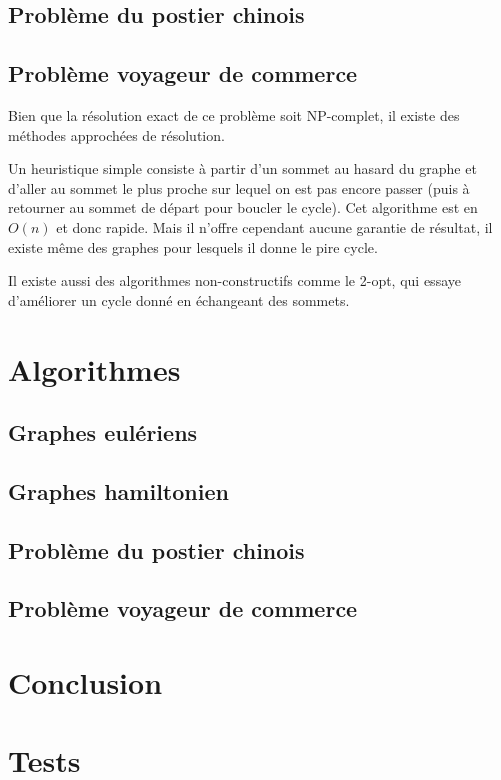 \documentclass{scrartcl}
\begin{document}
  \subsection{Problème du postier chinois}
  \subsection{Problème voyageur de commerce}
    Bien que la résolution exact de ce problème soit NP-complet, il existe des
    méthodes approchées de résolution.

    Un heuristique simple consiste à partir d'un sommet au hasard du graphe et
    d'aller au sommet le plus proche sur lequel on est pas encore passer (puis
    à retourner au sommet de départ pour boucler le cycle). Cet algorithme est
    en $O(n)$ et donc rapide. Mais il n'offre cependant aucune garantie de
    résultat, il existe même des graphes pour lesquels il donne le pire cycle.

    Il existe aussi des algorithmes non-constructifs comme le 2-opt, qui essaye
    d'améliorer un cycle donné en échangeant des sommets.


\section{Algorithmes}
  \subsection{Graphes eulériens}
  \subsection{Graphes hamiltonien}
  \subsection{Problème du postier chinois}
  \subsection{Problème voyageur de commerce}
  
\section{Conclusion}

\section{Tests}
\end{document}
